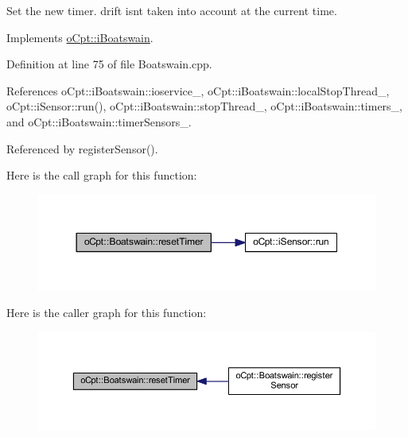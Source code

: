 Set the new timer. drift isn\textquotesingle{}t taken into account at the current time.

Implements \hyperlink{classo_cpt_1_1i_boatswain_a863c877ec067c55b5e06a04d0d9648ce}{o\+Cpt\+::i\+Boatswain}.



Definition at line 75 of file Boatswain.\+cpp.



References o\+Cpt\+::i\+Boatswain\+::ioservice\+\_\+, o\+Cpt\+::i\+Boatswain\+::local\+Stop\+Thread\+\_\+, o\+Cpt\+::i\+Sensor\+::run(), o\+Cpt\+::i\+Boatswain\+::stop\+Thread\+\_\+, o\+Cpt\+::i\+Boatswain\+::timers\+\_\+, and o\+Cpt\+::i\+Boatswain\+::timer\+Sensors\+\_\+.



Referenced by register\+Sensor().

Here is the call graph for this function\+:\nopagebreak
\begin{figure}[H]
\begin{center}
\leavevmode
\includegraphics[width=350pt]{classo_cpt_1_1_boatswain_aca864b4219485c6d83ad0e92c7ea16fd_cgraph}
\end{center}
\end{figure}
Here is the caller graph for this function\+:\nopagebreak
\begin{figure}[H]
\begin{center}
\leavevmode
\includegraphics[width=350pt]{classo_cpt_1_1_boatswain_aca864b4219485c6d83ad0e92c7ea16fd_icgraph}
\end{center}
\end{figure}
\hypertarget{classo_cpt_1_1_boatswain_a7665a4439b8e71ece31ff5e9755caf09}{}\label{classo_cpt_1_1_boatswain_a7665a4439b8e71ece31ff5e9755caf09} 
